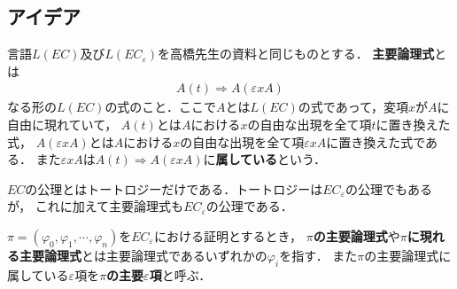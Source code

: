 	
\subsection{アイデア}
	言語$L(EC)$及び$L(EC_{\varepsilon})$を高橋先生の資料と同じものとする．
	{\bf 主要論理式}とは
	\begin{align}
		A(t) \Longrightarrow A(\varepsilon x A)
	\end{align}
	なる形の$L(EC)$の式のこと．ここで$A$とは$L(EC)$の式であって，変項$x$が$A$に自由に現れていて，
	$A(t)$とは$A$における$x$の自由な出現を全て項$t$に置き換えた式，
	$A(\varepsilon x A)$とは$A$における$x$の自由な出現を全て項$\varepsilon x A$に置き換えた式である．
	また$\varepsilon x A$は$A(t) \Longrightarrow A(\varepsilon x A)$に{\bf 属している}という．
	
	$EC$の公理とはトートロジーだけである．トートロジーは$EC_{\varepsilon}$の公理でもあるが，
	これに加えて主要論理式も$EC_{\varepsilon}$の公理である．
	
	$\pi = (\varphi_{0},\varphi_{1},\cdots,\varphi_{n})$を$EC_{\varepsilon}$における証明とするとき，
	{\bf $\pi$の主要論理式}や{\bf $\pi$に現れる主要論理式}とは主要論理式であるいずれかの$\varphi_{i}$を指す．
	また$\pi$の主要論理式に属している$\varepsilon$項を{\bf $\pi$の主要$\varepsilon$項}と呼ぶ．
	
